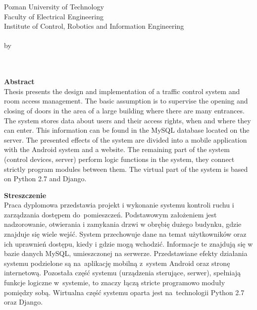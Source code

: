 \newpage
\thispagestyle{empty}
\begin{center}
Poznan University of Technology\\
Faculty of Electrical Engineering\\
Institute of Control, Robotics and Information Engineering\\
  \vspace{20mm}
\huge{\TytulAngielski} \\
\Large{by}\\
  \vspace{5mm}
\Large{\StudentA}\\
\Large{\StudentB}\\
  \vspace{20mm}

\normalsize\textbf{Abstract} \\
{Thesis presents the design and implementation of a traffic control system and room access management. \linebreak The basic assumption is to supervise the opening and closing of doors in the area of a large building where there are many entrances. The system stores data about users and their access rights, when and where they can enter. This information can be found in the MySQL database located on the server. The presented effects of the system are divided into a mobile application with the Android system and a website. The remaining part of the system (control devices, server) perform logic functions in the system, they connect strictly program modules between them. The virtual part of the system is based on Python 2.7 and Django.} 

\end{center}

\begin{center}
 \textbf{Streszczenie} \\
 {Praca dyplomowa przedstawia projekt i wykonanie systemu kontroli ruchu i zarządzania dostępem do~pomieszczeń. Podstawowym założeniem jest nadzorowanie, otwierania i zamykania drzwi w obrębię dużego budynku, gdzie znajduje się wiele wejść. System przechowuje dane na temat użytkowników oraz ich uprawnień dostępu, kiedy i gdzie mogą wchodzić. Informacje te znajdują się w bazie danych MySQL, umieszczonej na serwerze. Przedstawiane efekty działania systemu podzielone są na~aplikację mobilną z~system Android oraz stronę internetową. Pozostała część systemu (urządzenia sterujące, serwer), spełniają funkcje logiczne w~systemie, to znaczy łączą stricte programowo moduły pomiędzy sobą. Wirtualna część systemu oparta jest na~technologii Python 2.7 oraz Django.} 
\end{center}

 
